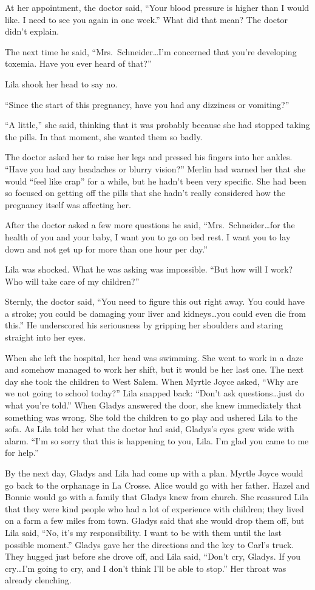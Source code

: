 \documentclass[
  letterpaper,
]{book}
\begin{document}
At her appointment, the doctor said, ``Your blood pressure is higher
than I would like. I need to see you again in one week.'' What did that
mean? The doctor didn't explain.

The next time he said, ``Mrs.~Schneider\ldots I'm concerned that you're
developing toxemia. Have you ever heard of that?''

Lila shook her head to say no.

``Since the start of this pregnancy, have you had any dizziness or
vomiting?''

``A little,'' she said, thinking that it was probably because she had
stopped taking the pills. In that moment, she wanted them so badly.

The doctor asked her to raise her legs and pressed his fingers into her
ankles. ``Have you had any headaches or blurry vision?'' Merlin had
warned her that she would ``feel like crap'' for a while, but he hadn't
been very specific. She had been so focused on getting off the pills
that she hadn't really considered how the pregnancy itself was affecting
her.

After the doctor asked a few more questions he said,
``Mrs.~Schneider\ldots for the health of you and your baby, I want you
to go on bed rest. I want you to lay down and not get up for more than
one hour per day.''

Lila was shocked. What he was asking was impossible. ``But how will I
work? Who will take care of my children?''

Sternly, the doctor said, ``You need to figure this out right away. You
could have a stroke; you could be damaging your liver and
kidneys\ldots you could even die from this.'' He underscored his
seriousness by gripping her shoulders and staring straight into her
eyes.

When she left the hospital, her head was swimming. She went to work in a
daze and somehow managed to work her shift, but it would be her last
one. The next day she took the children to West Salem. When Myrtle Joyce
asked, ``Why are we not going to school today?'' Lila snapped back:
``Don't ask questions\ldots just do what you're told.'' When Gladys
answered the door, she knew immediately that something was wrong. She
told the children to go play and ushered Lila to the sofa. As Lila told
her what the doctor had said, Gladys's eyes grew wide with alarm. ``I'm
so sorry that this is happening to you, Lila. I'm glad you came to me
for help.''

By the next day, Gladys and Lila had come up with a plan. Myrtle Joyce
would go back to the orphanage in La Crosse. Alice would go with her
father. Hazel and Bonnie would go with a family that Gladys knew from
church. She reassured Lila that they were kind people who had a lot of
experience with children; they lived on a farm a few miles from town.
Gladys said that she would drop them off, but Lila said, ``No, it's my
responsibility. I want to be with them until the last possible moment.''
Gladys gave her the directions and the key to Carl's truck. They hugged
just before she drove off, and Lila said, ``Don't cry, Gladys. If you
cry\ldots I'm going to cry, and I don't think I'll be able to stop.''
Her throat was already clenching.
\end{document}
